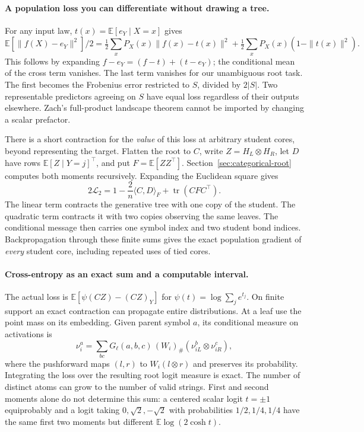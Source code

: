\paragraph{A population loss you can differentiate without drawing a tree.}
For any input law, $t(x)=\mathbb E[e_Y\mid X=x]$ gives
\[
 \mathbb E[\|f(X)-e_Y\|^2]/2
 =\tfrac12\sum_xP_X(x)\|f(x)-t(x)\|^2
  +\tfrac12\sum_xP_X(x)(1-\|t(x)\|^2).
\]
This follows by expanding $f-e_Y=(f-t)+(t-e_Y)$; the conditional mean
of the cross term vanishes. The last term vanishes for our unambiguous
root task. The first becomes the Frobenius error restricted to $S$, divided
by $2|S|$. Two representable predictors agreeing on $S$ have equal loss regardless of their outputs elsewhere.
Zach's full-product landscape theorem cannot be imported by changing a scalar prefactor.

There is a short contraction for the \emph{value} of this loss at arbitrary
student cores, beyond representing the target. Flatten the root to $C$,
write $Z=H_L\otimes H_R$, let $D$ have rows
$\mathbb E[Z\mid Y=j]^\top$, and put $F=\mathbb E[ZZ^\top]$.
Section~\ref{sec:categorical-root} computes both moments recursively.
Expanding the Euclidean square gives
\begin{equation}
 2\mathcal L_2=1-\frac{2}{n}\langle C,D\rangle_F
                +\operatorname{tr}(C F C^\top).
 \label{eq:full-square}
\end{equation}
The linear term contracts the generative tree with one copy of the student.
The quadratic term contracts it with two copies observing the same leaves.
The conditional message then carries one symbol index and two student bond
indices. Backpropagation through these finite sums gives the exact population
gradient of \emph{every} student core, including repeated uses of tied cores.

\paragraph{Cross-entropy as an exact sum and a computable interval.}
The actual loss is $\mathbb E[\psi(CZ)-(CZ)_Y]$ for
$\psi(t)=\log\sum_j e^{t_j}$. On finite support an exact contraction can
propagate entire distributions. At a leaf use the point mass on its embedding.
Given parent symbol $a$, its conditional measure on activations is
\[
 \nu_i^a=\sum_{bc}G_\ell(a,b,c)\,(W_i)_\#(\nu_{iL}^{b}\otimes\nu_{iR}^{c}),
\]
where the pushforward maps $(l,r)$ to $W_i(l\otimes r)$ and preserves
its probability. Integrating the loss over the resulting root logit
measure is exact. The number of distinct atoms can grow to the number
of valid strings. First and second moments alone do not determine this sum:
a centered scalar logit $t=\pm1$ equiprobably and a logit taking
$0,\sqrt2,-\sqrt2$ with probabilities $1/2,1/4,1/4$ have the same
first two moments but different $\mathbb E\log(2\cosh t)$.

